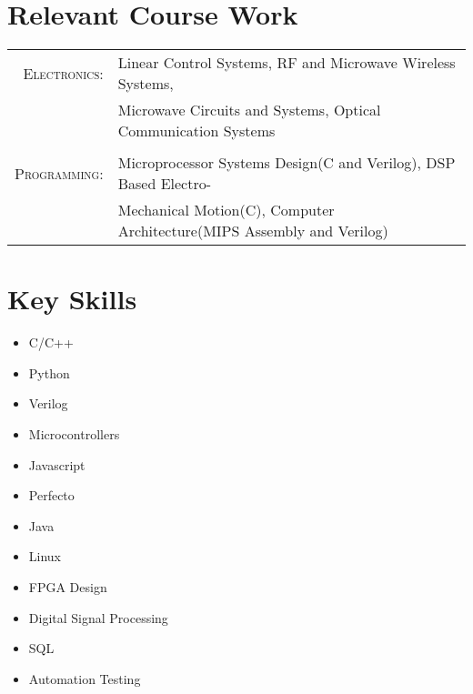 \documentclass[a4paper,10pt]{article} %
\begin{document}
\section{Relevant Course Work}

\begin{tabular}{rl}
\textsc{Electronics:} & Linear Control Systems, RF and Microwave Wireless Systems, \\
& Microwave Circuits and Systems, Optical Communication Systems \\
 
& \\

\textsc{Programming:} & Microprocessor Systems Design(C and Verilog), DSP Based Electro- \\ 
& Mechanical Motion(C), Computer Architecture(MIPS Assembly and Verilog) \\

\end{tabular}


\section{Key Skills}

\begin{multicols}{2}
\begin{itemize}
    \item C/C++
    \item Python
    \item Verilog
    \item Microcontrollers
    \item Javascript
    \item Perfecto
    \item Java
    \item Linux
    \item FPGA Design
	\item Digital Signal Processing
	\item SQL
	\item Automation Testing

\end{itemize}
\end{multicols}



\end{document}
